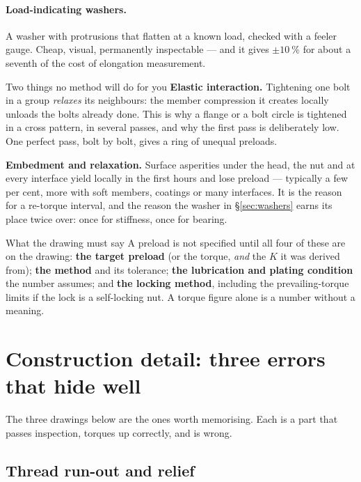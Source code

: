 \documentclass[11pt,a4paper]{article}
\begin{document}
\paragraph{Load-indicating washers.} A washer with protrusions that flatten at a known load, checked
with a feeler gauge. Cheap, visual, permanently inspectable --- and it gives
$\pm\SI{10}{\percent}$ for about a seventh of the cost of elongation measurement.

\begin{keybox}{Two things no method will do for you}
\textbf{Elastic interaction.} Tightening one bolt in a group \emph{relaxes} its neighbours: the
member compression it creates locally unloads the bolts already done. This is why a flange or a bolt
circle is tightened in a cross pattern, in several passes, and why the first pass is deliberately
low. One perfect pass, bolt by bolt, gives a ring of unequal preloads.

\medskip
\textbf{Embedment and relaxation.} Surface asperities under the head, the nut and at every interface
yield locally in the first hours and lose preload --- typically a few per cent, more with soft
members, coatings or many interfaces. It is the reason for a re-torque interval, and the reason the
washer in \S\ref{sec:washers} earns its place twice over: once for stiffness, once for bearing.
\end{keybox}

\begin{keybox}{What the drawing must say}
A preload is not specified until all four of these are on the drawing:
\textbf{the target preload} (or the torque, \emph{and} the $K$ it was derived from);
\textbf{the method} and its tolerance; \textbf{the lubrication and plating condition} the number
assumes; and \textbf{the locking method}, including the prevailing-torque limits if the lock is a
self-locking nut. A torque figure alone is a number without a meaning.
\end{keybox}

\section{Construction detail: three errors that hide well}

The three drawings below are the ones worth memorising. Each is a part that passes inspection, torques
up correctly, and is wrong.

\subsection{Thread run-out and relief}
\end{document}
